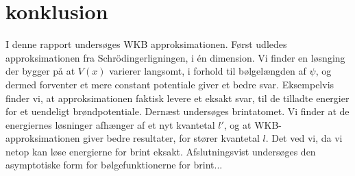 \section{konklusion}
I denne rapport undersøges WKB approksimationen. Først udledes approksimationen fra Schrödingerligningen, i én dimension. Vi finder en løsnging der bygger på at $V(x)$ varierer langsomt, i forhold til bølgelængden af $\psi$, og dermed forventer et mere constant potentiale giver et bedre svar. Eksempelvis finder vi, at approksimationen faktisk levere et eksakt svar, til de tilladte energier for et uendeligt brøndpotentiale. Dernæst undersøges brintatomet. Vi finder at de energiernes løsninger afhænger af et nyt kvantetal $l'$, og at WKB-approksimationen giver bedre resultater, for stører kvantetal $l$. Det ved vi, da vi netop kan løse energierne for brint eksakt. Afslutningsvist undersøges den asymptotiske form for bølgefunktionerne for brint... 
